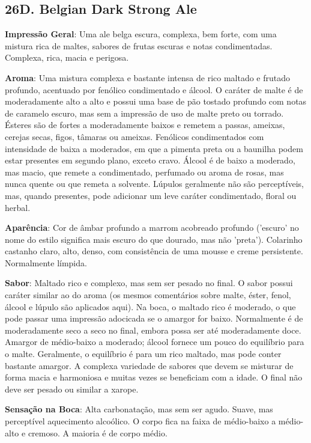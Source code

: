 \subsection*{26D. Belgian Dark Strong Ale}
\textbf{Impressão Geral}: Uma ale belga escura, complexa, bem forte, com uma mistura rica de maltes, sabores de frutas escuras e notas condimentadas. Complexa, rica, macia e perigosa.

\textbf{Aroma}: Uma mistura complexa e bastante intensa de rico maltado e frutado profundo, acentuado por fenólico condimentado e álcool. O caráter de malte é de moderadamente alto a alto e possui uma base de pão tostado profundo com notas de caramelo escuro, mas sem a impressão de uso de malte preto ou torrado. Ésteres são de fortes a moderadamente baixos e remetem a passas, ameixas, cerejas secas, figos, tâmaras ou ameixas. Fenólicos condimentados com intensidade de baixa a moderados, em que a pimenta preta ou a baunilha podem estar presentes em segundo plano, exceto cravo. Álcool é de baixo a moderado, mas macio, que remete a condimentado, perfumado ou aroma de rosas, mas nunca quente ou que remeta a solvente. Lúpulos geralmente não são perceptíveis, mas, quando presentes, pode adicionar um leve caráter condimentado, floral ou herbal.

\textbf{Aparência}: Cor de âmbar profundo a marrom acobreado profundo ('escuro' no nome do estilo significa mais escuro do que dourado, mas não 'preta'). Colarinho castanho claro, alto, denso, com consistência de uma mousse e creme persistente. Normalmente límpida.

\textbf{Sabor}: Maltado rico e complexo, mas sem ser pesado no final. O sabor possui caráter similar ao do aroma (os mesmos comentários sobre malte, éster, fenol, álcool e lúpulo são aplicados aqui). Na boca, o maltado rico é moderado, o que pode passar uma impressão adocicada se o amargor for baixo. Normalmente é de moderadamente seco a seco no final, embora possa ser até moderadamente doce. Amargor de médio-baixo a moderado; álcool fornece um pouco do equilíbrio para o malte. Geralmente, o equilíbrio é para um rico maltado, mas pode conter bastante amargor. A complexa variedade de sabores que devem se misturar de forma macia e harmoniosa e muitas vezes se beneficiam com a idade. O final não deve ser pesado ou similar a xarope.

\textbf{Sensação na Boca}: Alta carbonatação, mas sem ser agudo. Suave, mas perceptível aquecimento alcoólico. O corpo fica na faixa de médio-baixo a médio-alto e cremoso. A maioria é de corpo médio.

